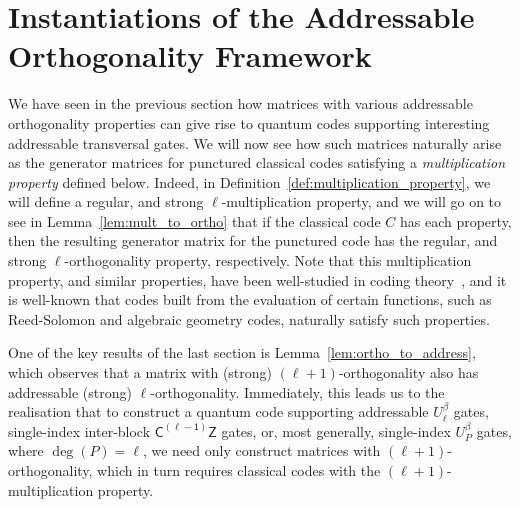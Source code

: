 \documentclass[11pt]{article}
\theoremstyle{definition}
\newcommand{\CLZ}{\mathsf{C^{(\ell-1)}Z}}
\begin{document}
\section{Instantiations of the Addressable Orthogonality Framework}
\label{sec:instantiations_orthogonality}

We have seen in the previous section how matrices with various addressable orthogonality properties can give rise to quantum codes supporting interesting addressable transversal gates. We will now see how such matrices naturally arise as the generator matrices for punctured classical codes satisfying a \textit{multiplication property} defined below. Indeed, in Definition~\ref{def:multiplication_property}, we will define a regular, and strong $\ell$-multiplication property, and we will go on to see in Lemma~\ref{lem:mult_to_ortho} that if the classical code $C$ has each property, then the resulting generator matrix for the punctured code has the regular, and strong $\ell$-orthogonality property, respectively. Note that this multiplication property, and similar properties, have been well-studied in coding theory~\cite{randriambololona2015products}, and it is well-known that codes built from the evaluation of certain functions, such as Reed-Solomon and algebraic geometry codes, naturally satisfy such properties.


One of the key results of the last section is Lemma~\ref{lem:ortho_to_address}, which observes that a matrix with (strong) $(\ell+1)$-orthogonality also has addressable (strong) $\ell$-orthogonality. Immediately, this leads us to the realisation that to construct a quantum code supporting addressable $U_\ell^\beta$ gates, single-index inter-block $\CLZ$ gates, or, most generally, single-index $U_P^\beta$ gates, where $\deg(P) = \ell$, we need only construct matrices with $(\ell+1)$-orthogonality, which in turn requires classical codes with the $(\ell+1)$-multiplication property.
\end{document}
